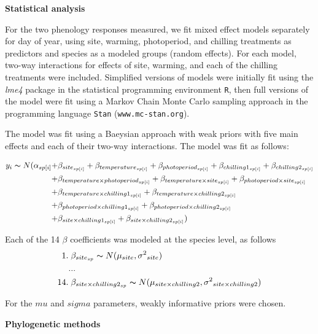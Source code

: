 \documentclass[11pt]{article}
\begin{document}
\textbf{Statistical analysis}

For the two phenology responses measured, we fit mixed effect models separately for day of year, using site, warming, photoperiod, and chilling treatments as predictors and species as a modeled groups (random effects). For each model, two-way interactions for effects of site, warming, and each of the chilling treatments were included. Simplified versions of models were initially fit using the \emph{lme4} package in the statistical programming environment \texttt{R}, then full versions of the model were fit using a Markov Chain Monte Carlo sampling approach in the programming language \texttt{Stan} \cite{Carpenter:2016aa}(\texttt{www.mc-stan.org}).

The model was fit using a Baeysian approach with weak priors with five main effects and each of their two-way interactions. The model was fit as follows:

\begin{align*}
y_i \thicksim N(\alpha_{sp[i]} +& \beta_{site_{sp[i]}} + \beta_{temperature_{sp[i]}} + \beta_{photoperiod_{sp[i]}} + \beta_{chilling1_{sp[i]}} + \beta_{chilling2_{sp[i]}}  \\
	+& \beta_{temperature \times photoperiod_{sp[i]}} + \beta_{temperature \times site_{sp[i]}} + \beta_{photoperiod \times site_{sp[i]}} \\
	+& \beta_{temperature \times chilling1_{sp[i]}} + \beta_{temperature \times chilling2_{sp[i]}} \\
	+& \beta_{photoperiod \times chilling1_{sp[i]}} + \beta_{photoperiod \times chilling2_{sp[i]}} \\
	+& \beta_{site \times chilling1_{sp[i]}}  + \beta_{site \times chilling2_{sp[i]}} )
\end{align*}

Each of the 14 $\beta$ coefficients was modeled at the species level, as follows
\begin{align*}
1.& \; \beta_{site_{sp}} \thicksim N(\mu_{site}, \sigma{^2}_{site}) \\
   &... \\
14.& \; \beta_{site \times chilling2_{sp}} \thicksim N(\mu_{site \times chilling2}, \sigma{^2}_{site \times chilling2})
\end{align*}

For the $mu$ and $sigma$ parameters, weakly informative priors were chosen.

\textbf{Phylogenetic methods}
\end{document}
